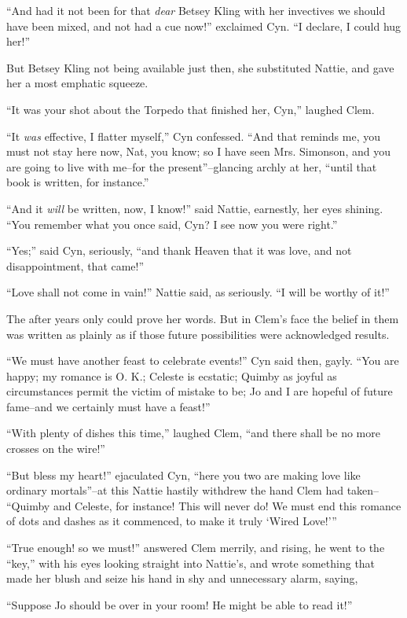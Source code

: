 ``And had it not been for that \emph{dear} Betsey Kling with her invectives we
should have been mixed, and not had a cue now!'' exclaimed Cyn. ``I
declare, I could hug her!''

But Betsey Kling not being available just then, she substituted Nattie,
and gave her a most emphatic squeeze.

``It was your shot about the Torpedo that finished her, Cyn,'' laughed
Clem.

``It \emph{was} effective, I flatter myself,'' Cyn confessed. ``And that reminds
me, you must not stay here now, Nat, you know; so I have seen Mrs.
Simonson, and you are going to live with me--for the present''--glancing
archly at her, ``until that book is written, for instance.''

``And it \emph{will} be written, now, I know!'' said Nattie, earnestly, her eyes
shining. ``You remember what you once said, Cyn? I see now you were
right.''

``Yes;'' said Cyn, seriously, ``and thank Heaven that it was love, and not
disappointment, that came!''

``Love shall not come in vain!'' Nattie said, as seriously. ``I will be
worthy of it!''

The after years only could prove her words. But in Clem's face the
belief in them was written as plainly as if those future possibilities
were acknowledged results.

``We must have another feast to celebrate events!'' Cyn said then, gayly.
``You are happy; my romance is O. K.; Celeste is ecstatic; Quimby as
joyful as circumstances permit the victim of mistake to be; Jo and I are
hopeful of future fame--and we certainly must have a feast!''

``With plenty of dishes this time,'' laughed Clem, ``and there shall be no
more crosses on the wire!''

``But bless my heart!'' ejaculated Cyn, ``here you two are making love
like ordinary mortals''--at this Nattie hastily withdrew the hand Clem
had taken-- ``Quimby and Celeste, for instance! This will never do! We
must end this romance of dots and dashes as it commenced, to make it
truly `Wired Love!'{}''

``True enough! so we must!'' answered Clem merrily, and rising, he went to
the ``key,'' with his eyes looking straight into Nattie's, and wrote
something that made her blush and seize his hand in shy and unnecessary
alarm, saying,

``Suppose Jo should be over in your room! He might be able to read it!''

